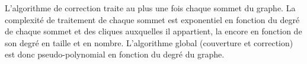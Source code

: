 %
%
% 
%
%
%
% 
%

L'algorithme de correction traite au plus une fois chaque sommet du graphe.
La complexit\'e de traitement de chaque sommet est exponentiel en fonction du degr\'e de chaque sommet et des cliques auxquelles il appartient, la encore en fonction  de son degr\'e en taille et en nombre.
L'algorithme global (couverture et correction) est donc pseudo-polynomial en fonction du degr\'e du graphe.
\newline

